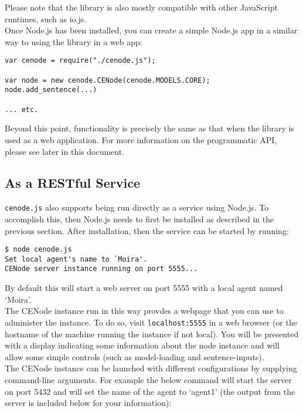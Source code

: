 \documentclass{article}
\begin{document}
Please note that the library is also mostly compatible with other JavaScript runtimes, such as io.js.\\

Once Node.js has been installed, you can create a simple Node.js app in a similar way to using the library in a web app:
\begin{verbatim}
var cenode = require("./cenode.js");

var node = new cenode.CENode(cenode.MODELS.CORE);
node.add_sentence(...)

... etc.
\end{verbatim}

Beyond this point, functionality is precisely the same as that when the library is used as a web application. For more information on the programmatic API, please see later in this document.

\subsection{As a RESTful Service}
\label{as_a_service}
\texttt{cenode.js} also supports being run directly as a service using Node.js. To accomplish this, then Node.js needs to first be installed as described in the previous section. After installation, then the service can be started by running:\\
\begin{verbatim}
$ node cenode.js
Set local agent's name to `Moira'.
CENode server instance running on port 5555...
\end{verbatim}

By default this will start a web server on port 5555 with a local agent named `Moira'.\\

The CENode instance run in this way provdes a webpage that you can use to administer the instance. To do so, visit \texttt{localhost:5555} in a web browser (or the hostname of the machine running the instance if not local). You will be presented with a display indicating some information about the node instance and will allow some simple controls (such as model-loading and sentence-inputs).\\

The CENode instance can be launched with different configurations by supplying command-line arguments. For example the below command will start the server on port 5432 and will set the name of the agent to `agent1' (the output from the server is included below for your information):\\
\end{document}
